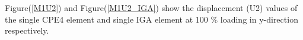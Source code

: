 \documentclass[12pt]{article}
\begin{document}

Figure(\ref{M1U2}) and Figure(\ref{M1U2_IGA}) show the displacement (U2) values of the single CPE4 element and single IGA element at 100 \% loading in y-direction respectively. \\
\end{document}
